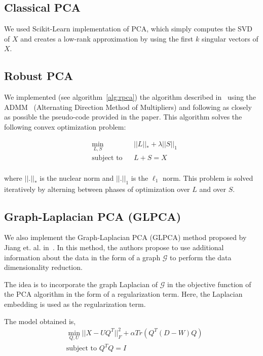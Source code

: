 \documentclass[sigconf]{acmart}
\begin{document}
\subsection{Classical PCA} 

We used Scikit-Learn implementation of PCA, which simply computes the SVD of $X$ and creates a low-rank approximation by using the first $k$ singular vectors of $X$.

\subsection{Robust PCA}

We implemented (see algorithm~\ref{alg:rpca}) the algorithm described in~\cite{rpca_paper} using the ADMM~\cite{admm_paper} (Alternating Direction Method of Multipliers) and following as closely as possible the pseudo-code provided in the paper.
  This algorithm solves the following convex optimization problem:

  \begin{equation*}
    \begin{aligned}
    & \underset{L, S}{\min}
    & & ||L||_* + \lambda ||S||_1 \\
    & \text{subject to}
    & & L + S = X \\
    \end{aligned}
  \end{equation*}

  where $||.||_*$ is the nuclear norm and $||.||_1$ is the $\ell_1$ norm. This problem is solved iteratively by alterning between phases of optimization over $L$ and over $S$.
  
\subsection{Graph-Laplacian PCA (GLPCA)}

We also implement the Graph-Laplacian PCA (GLPCA) method proposed by Jiang et. al. in~\cite{glpca_paper}. In this method, the authors propose to use additional information about the data in the form of a graph $\mathcal{G}$ to perform the data dimensionality reduction.

The idea is to incorporate the graph Laplacian of $\mathcal{G}$ in the objective function of the PCA algorithm in the form of a regularization term. Here, the Laplacian embedding \cite{Laplacian_embedding} is used as the regularization term.

The model obtained is,
\begin{align*}
    & \min_{Q, U} ||X - UQ^T||_F^2 + \alpha Tr(Q^T (D-W) Q) \\
    & \text{subject to } Q^TQ = I
\end{align*}
\end{document}
